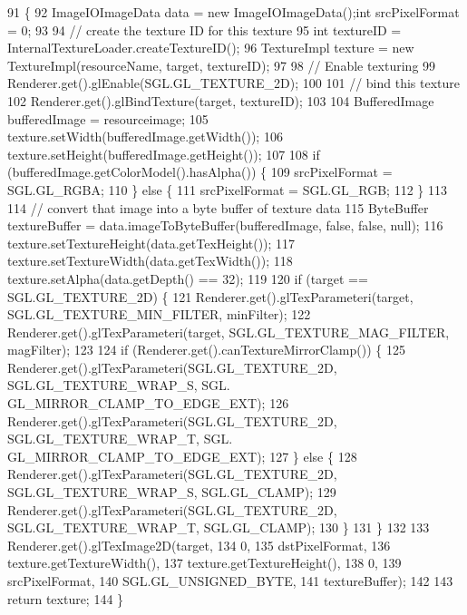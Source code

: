 \begin{DoxyCode}
91                                                              \{
92         ImageIOImageData data = \textcolor{keyword}{new} ImageIOImageData();\textcolor{keywordtype}{int} srcPixelFormat = 0;
93 
94         \textcolor{comment}{// create the texture ID for this texture}
95         \textcolor{keywordtype}{int} textureID = InternalTextureLoader.createTextureID();
96         TextureImpl texture = \textcolor{keyword}{new} TextureImpl(resourceName, target, textureID);
97 
98         \textcolor{comment}{// Enable texturing}
99         Renderer.get().glEnable(SGL.GL\_TEXTURE\_2D);
100 
101         \textcolor{comment}{// bind this texture}
102         Renderer.get().glBindTexture(target, textureID);
103 
104         BufferedImage bufferedImage = resourceimage;
105         texture.setWidth(bufferedImage.getWidth());
106         texture.setHeight(bufferedImage.getHeight());
107 
108         \textcolor{keywordflow}{if} (bufferedImage.getColorModel().hasAlpha()) \{
109             srcPixelFormat = SGL.GL\_RGBA;
110         \} \textcolor{keywordflow}{else} \{
111             srcPixelFormat = SGL.GL\_RGB;
112         \}
113 
114         \textcolor{comment}{// convert that image into a byte buffer of texture data}
115         ByteBuffer textureBuffer = data.imageToByteBuffer(bufferedImage, \textcolor{keyword}{false}, \textcolor{keyword}{false}, null);
116         texture.setTextureHeight(data.getTexHeight());
117         texture.setTextureWidth(data.getTexWidth());
118         texture.setAlpha(data.getDepth() == 32);
119         
120         \textcolor{keywordflow}{if} (target == SGL.GL\_TEXTURE\_2D) \{
121             Renderer.get().glTexParameteri(target, SGL.GL\_TEXTURE\_MIN\_FILTER, minFilter);
122             Renderer.get().glTexParameteri(target, SGL.GL\_TEXTURE\_MAG\_FILTER, magFilter);
123             
124             \textcolor{keywordflow}{if} (Renderer.get().canTextureMirrorClamp()) \{
125                 Renderer.get().glTexParameteri(SGL.GL\_TEXTURE\_2D, SGL.GL\_TEXTURE\_WRAP\_S, SGL.
      GL\_MIRROR\_CLAMP\_TO\_EDGE\_EXT);
126                 Renderer.get().glTexParameteri(SGL.GL\_TEXTURE\_2D, SGL.GL\_TEXTURE\_WRAP\_T, SGL.
      GL\_MIRROR\_CLAMP\_TO\_EDGE\_EXT);
127             \} \textcolor{keywordflow}{else} \{
128                 Renderer.get().glTexParameteri(SGL.GL\_TEXTURE\_2D, SGL.GL\_TEXTURE\_WRAP\_S, SGL.GL\_CLAMP);
129                 Renderer.get().glTexParameteri(SGL.GL\_TEXTURE\_2D, SGL.GL\_TEXTURE\_WRAP\_T, SGL.GL\_CLAMP);
130             \}
131         \}
132 
133         Renderer.get().glTexImage2D(target, 
134                       0, 
135                       dstPixelFormat, 
136                       texture.getTextureWidth(), 
137                       texture.getTextureHeight(), 
138                       0, 
139                       srcPixelFormat, 
140                       SGL.GL\_UNSIGNED\_BYTE, 
141                       textureBuffer); 
142 
143         \textcolor{keywordflow}{return} texture;
144     \}
\end{DoxyCode}
